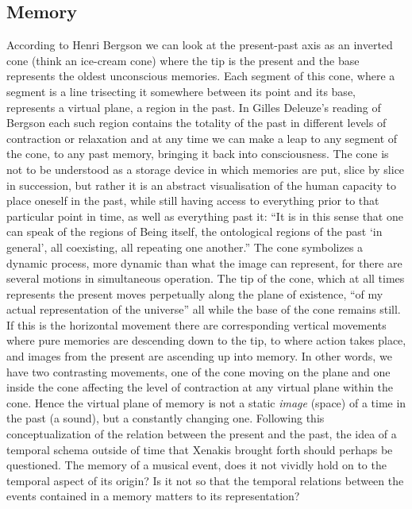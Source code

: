 \subsection*{Memory}
\label{sec:memory}


According to Henri Bergson we can look at the present-past axis as an inverted cone (think an ice-cream cone) where the tip is the present and the base represents the oldest unconscious memories. Each segment of this cone, where a segment is a line trisecting it somewhere between its point and its base, represents a virtual plane, a region in the past. \parencite[][Ch.3]{bergson91} 
In Gilles Deleuze's reading of Bergson each such region contains the totality of the past in different levels of contraction or relaxation and at any time we can make a leap to any segment of the cone, to any past memory, bringing it back into consciousness. \parencite[][60]{deleuze88} The cone is not to be understood as a storage device in which memories are put, slice by slice in succession, but rather it is an abstract visualisation of the human capacity to place oneself in the past, while still having access to everything prior to that particular point in time, as well as everything past it: ``It is in this sense that one can speak of the regions of Being itself, the ontological regions of the past `in general', all coexisting, all repeating one another.'' \parencite[61]{deleuze88}
The cone symbolizes a dynamic process, more dynamic than what the image can represent, for there are several motions in simultaneous operation. The tip of the cone, which at all times represents the present moves perpetually along the plane of existence, ``of my actual representation of the universe'' all while the base of the cone remains still. If this is the horizontal movement there are corresponding vertical movements where pure memories are descending down to the tip, to where action takes place, and images from the present are ascending up into memory. \parencite[See also][47-8]{lawlor03} In other words, we have two contrasting movements, one of the cone moving on the plane and one inside the cone affecting the level of contraction at any virtual plane within the cone. Hence the virtual plane of memory is not a static \emph{image} (space) of a time in the past (a sound), but a constantly changing one. Following this conceptualization of the relation between the present and the past, the idea of a temporal schema outside of time that Xenakis brought forth should perhaps be questioned. The memory of a musical event, does it not vividly hold on to the temporal aspect of its origin? Is it not so that the temporal relations between the events contained in a memory matters to its representation?

